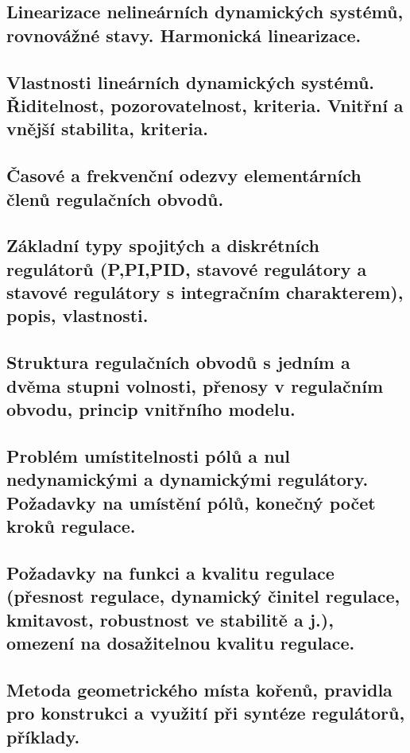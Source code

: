 \subsection{Linearizace nelineárních dynamických systémů, rovnovážné stavy. Harmonická linearizace.}

\subsection{Vlastnosti lineárních dynamických systémů. Řiditelnost, pozorovatelnost, kriteria. Vnitřní a vnější stabilita, kriteria.}

\subsection{Časové a frekvenční odezvy elementárních členů regulačních obvodů.}

\subsection{Základní typy spojitých a diskrétních regulátorů (P,PI,PID, stavové regulátory a stavové regulátory s integračním charakterem), popis, vlastnosti.}

\subsection{Struktura regulačních obvodů s jedním a dvěma stupni volnosti, přenosy v regulačním obvodu, princip vnitřního modelu.}

\subsection{Problém umístitelnosti pólů a nul nedynamickými a dynamickými regulátory. Požadavky na umístění pólů, konečný počet kroků regulace.}

\subsection{Požadavky na funkci a kvalitu regulace (přesnost regulace, dynamický činitel regulace, kmitavost, robustnost ve stabilitě a j.), omezení na dosažitelnou kvalitu regulace.}

\subsection{Metoda geometrického místa kořenů, pravidla pro konstrukci a využití při syntéze regulátorů, příklady.}

